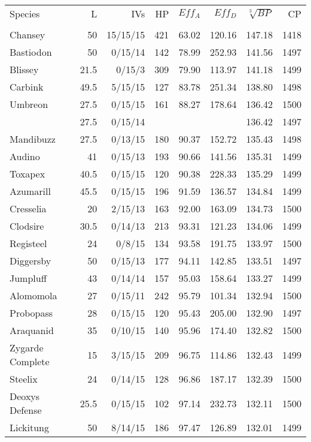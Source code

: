 \begingroup
\nohyphenation
\footnotesize
\setlength{\tabcolsep}{1pt}
\begin{longtable}{lrrrrrrr}
Species & L & IVs & HP & $Eff_A$ & $Eff_D$ & $\sqrt[3]{BP}$ & CP \\
\Midrule\\
\endhead
Chansey & 50 & 15/15/15 & 421 & 63.02 & 120.16 & 147.18 & 1418\\
Bastiodon & 50 & 0/15/14 & 142 & 78.99 & 252.93 & 141.56 & 1497\\
Blissey & 21.5 & 0/15/3 & 309 & 79.90 & 113.97 & 141.18 & 1499\\
Carbink & 49.5 & 5/15/15 & 127 & 83.78 & 251.34 & 138.80 & 1498\\
Umbreon & 27.5 & 0/15/15 & 161 & 88.27 & 178.64 & 136.42 & 1500\\
 & 27.5 & 0/15/14 & & & & 136.42 & 1497\\
Mandibuzz & 27.5 & 0/13/15 & 180 & 90.37 & 152.72 & 135.43 & 1498\\
Audino & 41 & 0/15/13 & 193 & 90.66 & 141.56 & 135.31 & 1499\\
Toxapex & 40.5 & 0/15/15 & 120 & 90.38 & 228.33 & 135.29 & 1499\\
Azumarill & 45.5 & 0/15/15 & 196 & 91.59 & 136.57 & 134.84 & 1499\\
Cresselia & 20 & 2/15/13 & 163 & 92.00 & 163.09 & 134.73 & 1500\\
Clodsire & 30.5 & 0/14/13 & 213 & 93.31 & 121.23 & 134.06 & 1499\\
Registeel & 24 & 0/8/15 & 134 & 93.58 & 191.75 & 133.97 & 1500\\
Diggersby & 50 & 0/15/13 & 177 & 94.11 & 142.85 & 133.51 & 1497\\
Jumpluff & 43 & 0/14/14 & 157 & 95.03 & 158.64 & 133.27 & 1499\\
Alomomola & 27 & 0/15/11 & 242 & 95.79 & 101.34 & 132.94 & 1500\\
Probopass & 28 & 0/15/15 & 120 & 95.43 & 205.00 & 132.90 & 1497\\
Araquanid & 35 & 0/10/15 & 140 & 95.96 & 174.40 & 132.82 & 1500\\
Zygarde Complete & 15 & 3/15/15 & 209 & 96.75 & 114.86 & 132.43 & 1499\\
Steelix & 24 & 0/14/15 & 128 & 96.86 & 187.17 & 132.39 & 1500\\
Deoxys Defense & 25.5 & 0/15/15 & 102 & 97.14 & 232.73 & 132.11 & 1500\\
Lickitung & 50 & 8/14/15 & 186 & 97.47 & 126.89 & 132.01 & 1499\\

\end{longtable}
